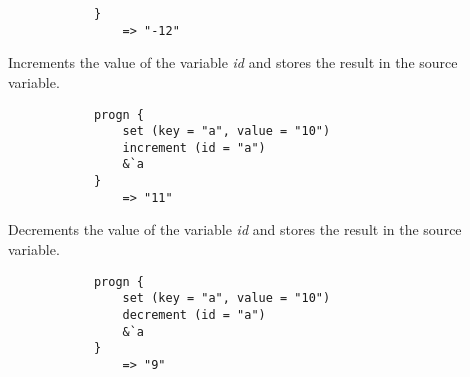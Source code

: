 \begin{multicols*}{2}
\begin{verbatim}
			}
			    => "-12"
    \end{verbatim}
    Increments the value of the variable \textit{id} and stores the result in the source variable.
    \begin{verbatim}
			progn {
			    set (key = "a", value = "10")
			    increment (id = "a")
			    &`a
			}
			    => "11"
    \end{verbatim}
    Decrements the value of the variable \textit{id} and stores the result in the source variable.
    \begin{verbatim}
			progn {
			    set (key = "a", value = "10")
			    decrement (id = "a")
			    &`a
			}
			    => "9"
    \end{verbatim}
\end{multicols*}